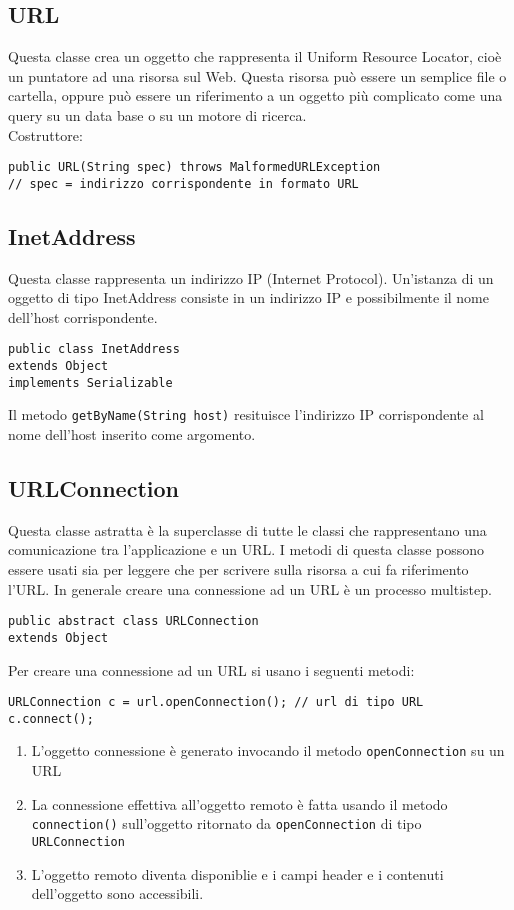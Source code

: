 \documentclass[a4paper, titlepage]{article}
\begin{document}
		\subsection{URL}
		Questa classe crea un oggetto che rappresenta il Uniform Resource Locator,
		cioè un puntatore ad una risorsa sul Web. Questa risorsa può essere un semplice 
		file o cartella, oppure può essere un riferimento a un oggetto più complicato
		come una query su un data base o su un motore di ricerca.\\
		Costruttore:
		\begin{lstlisting}
public URL(String spec) throws MalformedURLException
// spec = indirizzo corrispondente in formato URL
		\end{lstlisting}
		\subsection{InetAddress}
		Questa classe rappresenta un indirizzo IP (Internet Protocol). Un'istanza di un oggetto di tipo 
		InetAddress consiste in un indirizzo IP e possibilmente il nome dell'host corrispondente.
		\begin{lstlisting}
public class InetAddress
extends Object
implements Serializable
		\end{lstlisting}
		Il metodo \lstinline!getByName(String host)! resituisce l'indirizzo IP corrispondente al nome
		dell'host inserito come argomento.
		\subsection{URLConnection}
		Questa classe astratta è la superclasse di tutte le classi che rappresentano una comunicazione tra
		l'applicazione e un URL. I metodi di questa classe possono essere usati sia per leggere che per
		scrivere sulla risorsa a cui fa riferimento l'URL. In generale creare una connessione ad un URL
		è un processo multistep.
		\begin{lstlisting}
public abstract class URLConnection
extends Object
		\end{lstlisting}
		Per creare una connessione ad un URL si usano i seguenti metodi:
		\begin{lstlisting}
URLConnection c = url.openConnection(); // url di tipo URL
c.connect(); 
		\end{lstlisting}
		\begin{enumerate}
		\item L'oggetto connessione è generato invocando il metodo \lstinline!openConnection! su un URL
		\item La connessione effettiva all'oggetto remoto è fatta usando il metodo \lstinline!connection()! 
		sull'oggetto ritornato da \lstinline!openConnection! di tipo \lstinline!URLConnection!
		\item L'oggetto remoto diventa disponiblie e i campi header e i contenuti dell'oggetto sono
		 accessibili.
		\end{enumerate}
\end{document}
